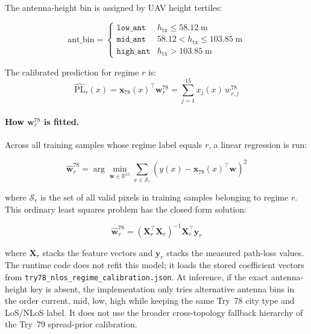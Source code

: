 The antenna-height bin is assigned by UAV height tertiles:

\begin{equation}
\mathrm{ant\_bin} =
\begin{cases}
\texttt{low\_ant}  & h_{\mathrm{tx}} \le 58.12\;\mathrm{m} \\
\texttt{mid\_ant}  & 58.12 < h_{\mathrm{tx}} \le 103.85\;\mathrm{m} \\
\texttt{high\_ant} & h_{\mathrm{tx}} > 103.85\;\mathrm{m}
\end{cases}
\label{eq:ant_bin_v2}
\end{equation}

The calibrated prediction for regime $r$ is:
\begin{equation}
\widehat{\mathrm{PL}}_{r}(x)
=
\textbf{x}_{78}(x)^\top \textbf{w}^{78}_{r}
=
\sum_{j=1}^{15} x_j(x)\,w^{78}_{r,j}
\label{eq:pl_cal}
\end{equation}

\paragraph{How $\textbf{w}^{78}_{r}$ is fitted.}
Across all training samples whose regime label equals $r$, a linear
regression is run:

\begin{equation}
\hat{\textbf{w}}^{78}_{r}
=
\arg\min_{\textbf{w}\in\mathbb{R}^{15}} \sum_{x \in \mathcal{S}_r} \left(y(x) - \textbf{x}_{78}(x)^\top \textbf{w}\right)^2
\label{eq:ols}
\end{equation}

where $\mathcal{S}_r$ is the set of all valid pixels in training samples
belonging to regime $r$. This ordinary least squares problem has the closed
form solution:

\begin{equation}
\hat{\textbf{w}}^{78}_{r}
=
\left(\textbf{X}_r^\top \textbf{X}_r\right)^{-1}
\textbf{X}_r^\top \textbf{y}_r
\label{eq:ols_closed}
\end{equation}

where $\textbf{X}_r$ stacks the feature vectors and $\textbf{y}_r$ stacks
the measured path-loss values. The runtime code does not refit this model; it
loads the stored coefficient vectors from
\texttt{try78\_nlos\_regime\_calibration.json}. At inference, if the exact
antenna-height key is absent, the implementation only tries alternative
antenna bins in the order current, mid, low, high while keeping the same
Try~78 city type and LoS/NLoS label. It does not use the broader cross-topology
fallback hierarchy of the Try~79 spread-prior calibration.


